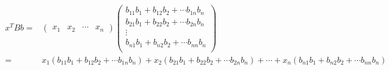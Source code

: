 \begin{align*}
x^T B b
=& 
\begin{pmatrix} x_1 & x_2 & \cdots & x_n\end{pmatrix}
\begin{pmatrix} 
b_{11} b_1 + b_{12} b_2 + \cdots b_{1n} b_n\\
b_{21} b_1 + b_{22} b_2 + \cdots b_{2n} b_n\\
\vdots\\
b_{n1} b_1 + b_{n2} b_2 + \cdots b_{nn} b_n\\
\end{pmatrix}\\
=& 
x_1(b_{11} b_1 + b_{12} b_2 + \cdots b_{1n} b_n)+
x_2(b_{21} b_1 + b_{22} b_2 + \cdots b_{2n} b_n)+\cdots+
x_n(b_{n1} b_1 + b_{n2} b_2 + \cdots b_{nn} b_n)
\end{align*}